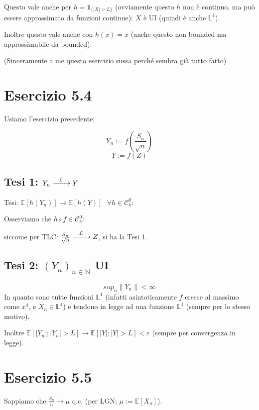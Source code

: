 \documentclass{article}
\newcommand{\myrightarrow}[1]{\xrightarrow{\makebox[2em][c]{$\scriptstyle#1$}}}
\newcommand{\convlegge}{\myrightarrow{\mathcal{L}}}
\begin{document}
Questo vale anche per $h = \mathds{1}_{\{|X|>L\}}$ (ovviamente questo $h$ non è continuo, ma può essere approssimato da funzioni continue): $X$ è UI (quindi è anche $\mathbb{L}^1$).

Inoltre questo vale anche con $h\left(x\right) =x$ (anche questo non bounded ma approssimabile da bounded).


(Sinceramente a me questo esercizio sussa perché sembra già tutto fatto)


\section{Esercizio 5.4}
Usiamo l'esercizio precedente:

\[Y_n := f\left(\frac{S_n}{\sqrt{n}}\right)\]
\[Y:=f(Z)\]

\subsection{Tesi 1: $Y_n \convlegge Y$}
Tesi: $\mathbb{E}\left[h\left(Y_n\right)\right] \rightarrow  \mathbb{E}\left[h\left(Y\right)\right]\ \ \ \forall h\in \mathcal{C}^0_b$:

Osserviamo che $h\circ f\in \mathcal{C}^0_b$:

siccome per TLC: $\frac{S_n}{\sqrt{n}} \convlegge Z$, si ha la Tesi 1.

\subsection{Tesi 2: $\left(Y_n\right)_{n\in \mathbb{N}}$ UI}
\[sup_n \|Y_n\| < \infty \]
In quanto sono tutte funzioni $\mathbb{L}^1$ (infatti asintoticamente $f$ cresce al massimo come $x^4$, e $X_n\in \mathbb{L}^4$) e tendono in legge ad una funzione $\mathbb{L}^1$ (sempre per lo stesso motivo).

Inoltre $\mathbb{E}\left[|Y_n|; |Y_n|>L\right] \rightarrow  \mathbb{E}\left[|Y|;|Y|>L\right] < \varepsilon $ (sempre per convergenza in legge). 


\section{Esercizio 5.5}
Sappiamo che $\frac{S_n}{n} \longrightarrow \mu $ q.c. (per LGN; $\mu := \mathbb{E}[X_n]$).









\end{document}
